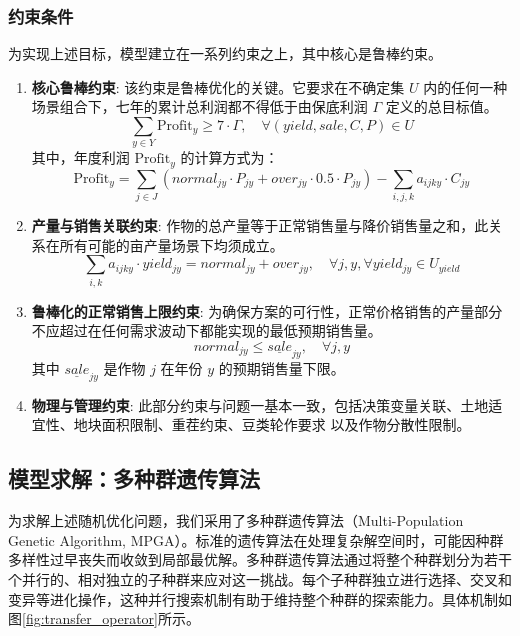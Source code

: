 \subsubsection{约束条件}
为实现上述目标，模型建立在一系列约束之上，其中核心是鲁棒约束。
\begin{enumerate}
	\item \textbf{核心鲁棒约束}: 该约束是鲁棒优化的关键。它要求在不确定集 $U$ 内的任何一种场景组合下，七年的累计总利润都不得低于由保底利润 $\Gamma$ 定义的总目标值。
	      \begin{equation}
		      \sum_{y \in Y} \text{Profit}_y \ge 7 \cdot \Gamma, \quad \forall (yield, sale, C, P) \in U \label{eq:robust_core}
	      \end{equation}
	      其中，年度利润 $\text{Profit}_y$ 的计算方式为：
	      \begin{equation}
		      \text{Profit}_y = \sum_{j \in J} (normal_{jy} \cdot P_{jy} + over_{jy} \cdot 0.5 \cdot P_{jy}) - \sum_{i,j,k} a_{ijky} \cdot C_{jy} \label{eq:profit_calc}
	      \end{equation}

	\item \textbf{产量与销售关联约束}: 作物的总产量等于正常销售量与降价销售量之和，此关系在所有可能的亩产量场景下均须成立。
	      \begin{equation}
		      \sum_{i,k} a_{ijky} \cdot yield_{jy} = normal_{jy} + over_{jy}, \quad \forall j, y, \forall yield_{jy} \in U_{yield} \label{eq:yield_balance}
	      \end{equation}

	\item \textbf{鲁棒化的正常销售上限约束}: 为确保方案的可行性，正常价格销售的产量部分不应超过在任何需求波动下都能实现的最低预期销售量。
	      \begin{equation}
		      normal_{jy} \le \underline{sale}_{jy}, \quad \forall j,y \label{eq:sale_limit_robust}
	      \end{equation}
	      其中 $\underline{sale}_{jy}$ 是作物 $j$ 在年份 $y$ 的预期销售量下限。

	\item \textbf{物理与管理约束}: 此部分约束与问题一基本一致，包括决策变量关联、土地适宜性、地块面积限制、重茬约束、豆类轮作要求 以及作物分散性限制。
\end{enumerate}

\subsection{模型求解：多种群遗传算法}
为求解上述随机优化问题，我们采用了多种群遗传算法（Multi-Population Genetic Algorithm, MPGA）。标准的遗传算法在处理复杂解空间时，可能因种群多样性过早丧失而收敛到局部最优解。多种群遗传算法通过将整个种群划分为若干个并行的、相对独立的子种群来应对这一挑战。每个子种群独立进行选择、交叉和变异等进化操作，这种并行搜索机制有助于维持整个种群的探索能力。具体机制如图\ref{fig:transfer_operator}所示。

